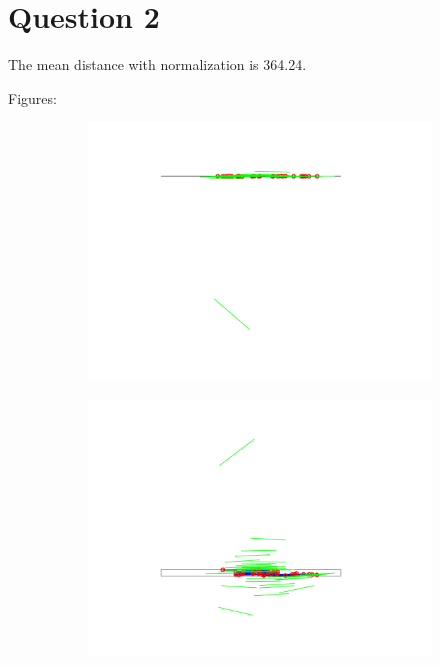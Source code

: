 \documentclass[a4paper]{article}
\begin{document}
\section*{Question 2}

The mean distance with normalization is 364.24.

Figures:

\begin{figure}[h]
\begin{subfigure}{0.5\textwidth}
\includegraphics[width=\textwidth]{epi1H.png}
\end{subfigure}
\begin{subfigure}{0.5\textwidth}
\includegraphics[width=\textwidth]{epi2H.png}
\end{subfigure}
\end{figure}
\end{document}

